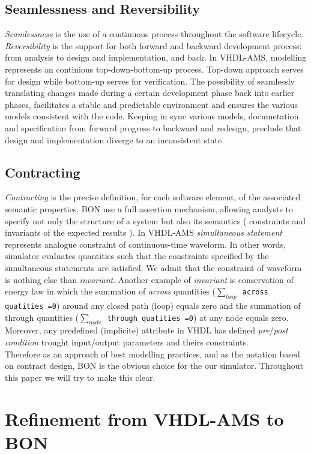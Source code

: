 \documentclass{article}
\newcommand{\arcoss}{\emph{across}\xspace}
\begin{document}
\subsection{Seamlessness and Reversibility}
\emph{Seamlessness} is the use of a continuous process 
throughout the software lifecycle.
\emph{Reversibility} is the support for both forward and 
backward development process: from analysis to design 
and implementation, and back.
In VHDL-AMS, modelling represents an continious top-down-bottom-up
process. Top-down approach serves for design while bottom-up
serves for verification. The possibility of seamlessly translating 
changes made during a certain development phase back into earlier phases,
facilitates a stable and predictable environment and ensures the various 
models consistent with the code. Keeping in sync various models, documetation
and specification from forward progress to backward and redesign, preclude 
that design and implementation diverge to an inconsistent state.   
\subsection{Contracting}
\emph{Contracting} is the precise definition, for each software element, 
of the associated semantic properties. BON use a full assertion mechanism, 
allowing analysts to specify not only the structure of a system but also its
semantics ( constraints and invariants of the expected results ). 
In VHDL-AMS \emph{simultaneous statement} represents analogue constraint of 
continuous-time waveform. In other words, simulator evaluates quantities such 
that the constraints specified by the simultaneous statements are satisfied. 
We admit that the constraint of waveform is nothing else than \emph{invariant}.
Another example of \emph{invariant} is conservation of energy law in which 
the summation of \arcoss quantities (\texttt{$\sum_{loop}$ across quatities =0}) 
around any closed path (loop) equals zero and the summation of through 
quantities (\texttt{$\sum_{node}$ through quatities =0}) at any node equals zero. 
Moreover, any predefined (implicite) attribute in VHDL 
has defined \emph{pre}/\emph{post condition} trought input/output 
parameters and theirs constraints. \\
Therefore as an approach of best modelling practices, and as the notation 
based on contract design, BON is the obvious choice 
for the our simulator.
Throughout this paper we will try to make this clear.  

\section{Refinement from VHDL-AMS to BON }
 
\end{document}
